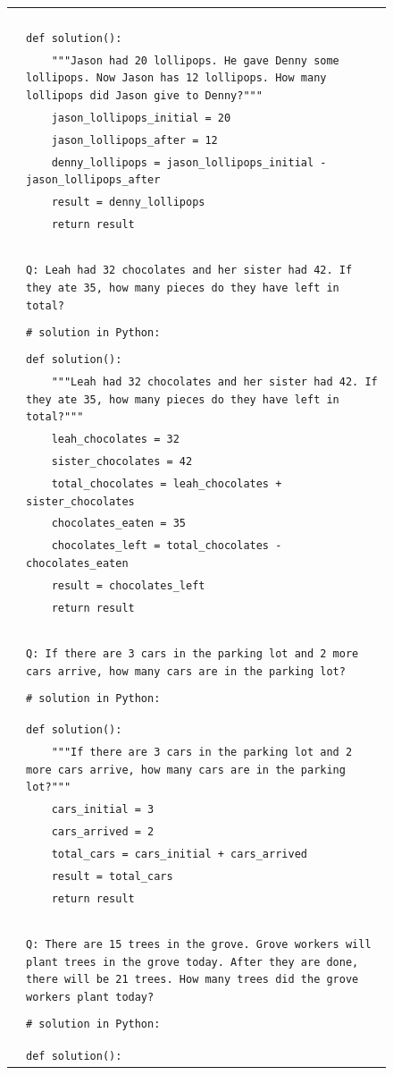 { %

\newcommand{\pWidth}{5in}
\newcommand{\pStart}{\setcounter{pCount}{1}}
\newcommand{\pRow}[1]{\texttt{\fontsize{6pt}{1pt}\selectfont\color{gray}\arabic{pCount}}&\texttt{\fontsize{6pt}{1pt}\selectfont#1}\stepcounter{pCount}\\}
\newcommand{\pVar}[1]{\textbf{\{#1\}}}
\newcommand{\pBlank}{\_\_\_\_\_}
\begin{figure}[p]
\begin{center}\scriptsize
\begin{tabular}{|rp{\pWidth}|}\hline\pStart&\\
\pRow{}
\pRow{}
\pRow{}
\pRow{def solution():}
\pRow{\ \ \ \ """Jason had 20 lollipops. He gave Denny some lollipops. Now Jason has 12 lollipops. How many lollipops did Jason give to Denny?"""}
\pRow{\ \ \ \ jason\_lollipops\_initial = 20}
\pRow{\ \ \ \ jason\_lollipops\_after = 12}
\pRow{\ \ \ \ denny\_lollipops = jason\_lollipops\_initial - jason\_lollipops\_after}
\pRow{\ \ \ \ result = denny\_lollipops}
\pRow{\ \ \ \ return result}
\pRow{}
\pRow{}
\pRow{}
\pRow{}
\pRow{}
\pRow{Q: Leah had 32 chocolates and her sister had 42. If they ate 35, how many pieces do they have left in total?}
\pRow{}
\pRow{\# solution in Python:}
\pRow{}
\pRow{def solution():}
\pRow{\ \ \ \ """Leah had 32 chocolates and her sister had 42. If they ate 35, how many pieces do they have left in total?"""}
\pRow{\ \ \ \ leah\_chocolates = 32}
\pRow{\ \ \ \ sister\_chocolates = 42}
\pRow{\ \ \ \ total\_chocolates = leah\_chocolates + sister\_chocolates}
\pRow{\ \ \ \ chocolates\_eaten = 35}
\pRow{\ \ \ \ chocolates\_left = total\_chocolates - chocolates\_eaten}
\pRow{\ \ \ \ result = chocolates\_left}
\pRow{\ \ \ \ return result}
\pRow{}
\pRow{}
\pRow{}
\pRow{}
\pRow{}
\pRow{Q: If there are 3 cars in the parking lot and 2 more cars arrive, how many cars are in the parking lot?}
\pRow{}
\pRow{\# solution in Python:}
\pRow{}
\pRow{}
\pRow{def solution():}
\pRow{\ \ \ \ """If there are 3 cars in the parking lot and 2 more cars arrive, how many cars are in the parking lot?"""}
\pRow{\ \ \ \ cars\_initial = 3}
\pRow{\ \ \ \ cars\_arrived = 2}
\pRow{\ \ \ \ total\_cars = cars\_initial + cars\_arrived}
\pRow{\ \ \ \ result = total\_cars}
\pRow{\ \ \ \ return result}
\pRow{}
\pRow{}
\pRow{}
\pRow{}
\pRow{}
\pRow{Q: There are 15 trees in the grove. Grove workers will plant trees in the grove today. After they are done, there will be 21 trees. How many trees did the grove workers plant today?}
\pRow{}
\pRow{\# solution in Python:}
\pRow{}
\pRow{}
\pRow{def solution():}

\end{tabular}
\end{center}
\end{figure}}
